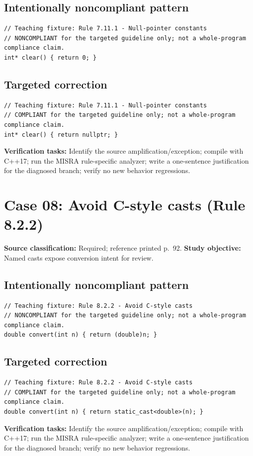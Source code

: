 \documentclass[10pt,letterpaper]{article}
\begin{document}
\subsection*{Intentionally noncompliant pattern}
\begin{lstlisting}
// Teaching fixture: Rule 7.11.1 - Null-pointer constants
// NONCOMPLIANT for the targeted guideline only; not a whole-program compliance claim.
int* clear() { return 0; }
\end{lstlisting}
\subsection*{Targeted correction}
\begin{lstlisting}
// Teaching fixture: Rule 7.11.1 - Null-pointer constants
// COMPLIANT for the targeted guideline only; not a whole-program compliance claim.
int* clear() { return nullptr; }
\end{lstlisting}
\textbf{Verification tasks:} Identify the source amplification/exception; compile with C++17; run the MISRA rule-specific analyzer; write a one-sentence justification for the diagnosed branch; verify no new behavior regressions.

\section{Case 08: Avoid C-style casts (Rule 8.2.2)}
\textbf{Source classification:} Required; reference printed p.~92. \textbf{Study objective:} Named casts expose conversion intent for review.
\subsection*{Intentionally noncompliant pattern}
\begin{lstlisting}
// Teaching fixture: Rule 8.2.2 - Avoid C-style casts
// NONCOMPLIANT for the targeted guideline only; not a whole-program compliance claim.
double convert(int n) { return (double)n; }
\end{lstlisting}
\subsection*{Targeted correction}
\begin{lstlisting}
// Teaching fixture: Rule 8.2.2 - Avoid C-style casts
// COMPLIANT for the targeted guideline only; not a whole-program compliance claim.
double convert(int n) { return static_cast<double>(n); }
\end{lstlisting}
\textbf{Verification tasks:} Identify the source amplification/exception; compile with C++17; run the MISRA rule-specific analyzer; write a one-sentence justification for the diagnosed branch; verify no new behavior regressions.
\end{document}
